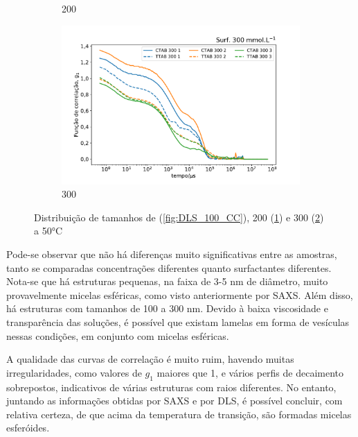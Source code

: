\begin{figure}[h]
\begin{subfigure}{0.3\textwidth}
		\caption{200\mM}
		\label{fig:DLS_200_CC}
	\end{subfigure} %
	\begin{subfigure}{0.3\textwidth}
		\centering
		\includegraphics[width=\textwidth]{imagens/dls/300_CC}
		\caption{300\mM}
		\label{fig:DLS_300_CC}
	\end{subfigure}
	\caption{Distribuição de tamanhos de  (\ref{fig:DLS_100_CC}), 200 (\ref{fig:DLS_200_CC}) e 300 (\ref{fig:DLS_300_CC}) \mM{} a 50°C}
	\label{fig:DLS_CC_conc}
\end{figure}

	Pode-se observar que não há diferenças muito significativas entre as amostras, tanto se comparadas concentrações diferentes quanto surfactantes diferentes. Nota-se que há estruturas pequenas, na faixa de 3-5 nm de diâmetro, muito provavelmente micelas esféricas, como visto anteriormente por SAXS. Além disso, há estruturas com tamanhos de 100 a 300 nm. Devido à baixa viscosidade e transparência das soluções, é possível que existam lamelas em forma de vesículas nessas condições, em conjunto com micelas esféricas.
	
	A qualidade das curvas de correlação é muito ruim, havendo muitas irregularidades, como valores de \(g_1\) maiores que 1, e vários perfis de decaimento sobrepostos, indicativos de várias estruturas com raios diferentes. No entanto, juntando as informações obtidas por SAXS e por DLS, é possível concluir, com relativa certeza, de que acima da temperatura de transição, são formadas micelas esferóides. 
	
